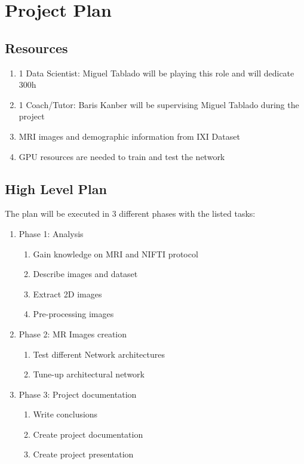 \section{Project Plan}

\subsection{Resources}

\begin{enumerate}
    \item 1 Data Scientist: Miguel Tablado will be playing this role and will dedicate 300h
    \item 1 Coach/Tutor: Baris Kanber will be supervising Miguel Tablado during the project
    \item MRI images and demographic information from IXI Dataset
    \item GPU resources are needed to train and test the network
\end{enumerate}

\subsection{High Level Plan}

The plan will be executed in 3 different phases with the listed tasks:
\begin{enumerate}
    \item Phase 1: Analysis
    \begin{enumerate}
        \item Gain knowledge on MRI and NIFTI protocol
        \item Describe images and dataset
        \item Extract 2D images
        \item Pre-processing images
    \end{enumerate}
    \item Phase 2: MR Images creation
    \begin{enumerate}
        \item Test different Network architectures
        \item Tune-up architectural network
    \end{enumerate}
    \item Phase 3: Project documentation
    \begin{enumerate}
        \item Write conclusions
        \item Create project documentation
        \item Create project presentation
    \end{enumerate}
\end{enumerate}

